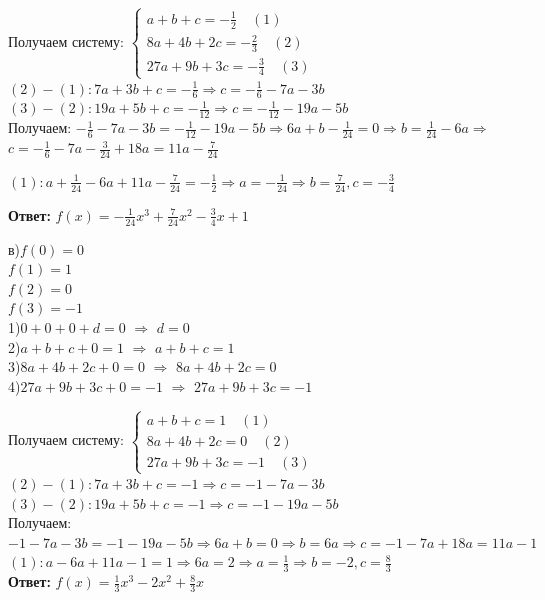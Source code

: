 \documentclass[]{book}
\theoremstyle{definition}
\begin{document}
\begin{enumerate}
Получаем систему: 
$
\begin{cases}
   a+b+c=-\frac{1}{2} \quad (1) \\
   8a+4b+2c=-\frac{2}{3}\quad (2) \\
   27a+9b+3c=-\frac{3}{4}\quad (3)
 \end{cases}
$\\
$(2)-(1)\colon 7a+3b+c=-\frac{1}{6} \Longrightarrow c = -\frac{1}{6}-7a-3b$\\
$(3)-(2)\colon 19a+5b+c=-\frac{1}{12} \Longrightarrow c = -\frac{1}{12}-19a-5b$\\
Получаем: $-\frac{1}{6}-7a-3b=-\frac{1}{12}-19a-5b  \Longrightarrow 6a + b - \frac{1}{24} =0  \Longrightarrow b= \frac{1}{24}- 6a  \Longrightarrow $\\

$c= -\frac{1}{6}-7a-\frac{3}{24} +18a = 11a -\frac{7}{24}$

$(1): a + \frac{1}{24} -6a + 11a -\frac{7}{24} = -\frac{1}{2} \Longrightarrow a = -\frac{1}{24} \Longrightarrow b = \frac{7}{24}, c =-\frac{3}{4}$

\textbf{Ответ: } $f(x) = -\frac{1}{24}x^3+\frac{7}{24}x^2-\frac{3}{4}x+1$

в)$f(0) = 0$\\
$f(1) = 1$\\
$f(2) = 0$\\
$f(3) = -1$\\
1)$0+0+0+d=0$ $\Longrightarrow$ $d=0$\\
2)$a+b+c+0=1$ $\Longrightarrow$ $a+b+c=1$\\
3)$8a+4b+2c+0=0$ $\Longrightarrow$ $8a+4b+2c=0$\\
4)$27a+9b+3c+0=-1$ $\Longrightarrow$ $27a+9b+3c=-1$

Получаем систему: 
$
\begin{cases}
   a+b+c=1 \quad (1) \\
   8a+4b+2c=0\quad (2) \\
   27a+9b+3c=-1\quad (3)
 \end{cases}
$\\
$(2)-(1)\colon 7a+3b+c=-1 \Longrightarrow c = -1-7a-3b$\\
$(3)-(2)\colon 19a+5b+c=-1 \Longrightarrow c = -1-19a-5b$\\
Получаем: $-1-7a-3b=-1-19a-5b  \Longrightarrow 6a+b=0 \Longrightarrow b=6a \Longrightarrow c=-1-7a+18a = 11a-1$\\
$(1): a-6a+11a-1=1 \Longrightarrow 6a = 2 \Longrightarrow a = \frac{1}{3} \Longrightarrow b = -2, c =\frac{8}{3}$\\
\textbf{Ответ: } $f(x) = \frac{1}{3}x^3-2x^2+\frac{8}{3}x$


\end{enumerate}
\end{document}
